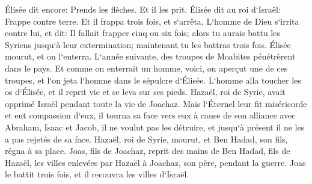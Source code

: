 \verse Élisée dit encore: Prends les flèches. Et il les prit. Élisée dit au roi d`Israël: Frappe contre terre. Et il frappa trois fois, et s`arrêta. 
\verse L`homme de Dieu s`irrita contre lui, et dit: Il fallait frapper cinq ou six fois; alors tu aurais battu les Syriens jusqu`à leur extermination; maintenant tu les battras trois fois. 
\verse Élisée mourut, et on l`enterra. L`année suivante, des troupes de Moabites pénétrèrent dans le pays. 
\verse Et comme on enterrait un homme, voici, on aperçut une de ces troupes, et l`on jeta l`homme dans le sépulcre d`Élisée. L`homme alla toucher les os d`Élisée, et il reprit vie et se leva sur ses pieds. 
\verse Hazaël, roi de Syrie, avait opprimé Israël pendant toute la vie de Joachaz. 
\verse Mais l`Éternel leur fit miséricorde et eut compassion d`eux, il tourna sa face vers eux à cause de son alliance avec Abraham, Isaac et Jacob, il ne voulut pas les détruire, et jusqu`à présent il ne les a pas rejetés de sa face. 
\verse Hazaël, roi de Syrie, mourut, et Ben Hadad, son fils, régna à sa place. 
\verse Joas, fils de Joachaz, reprit des mains de Ben Hadad, fils de Hazaël, les villes enlevées par Hazaël à Joachaz, son père, pendant la guerre. Joas le battit trois fois, et il recouvra les villes d`Israël. 

\chapter{}

